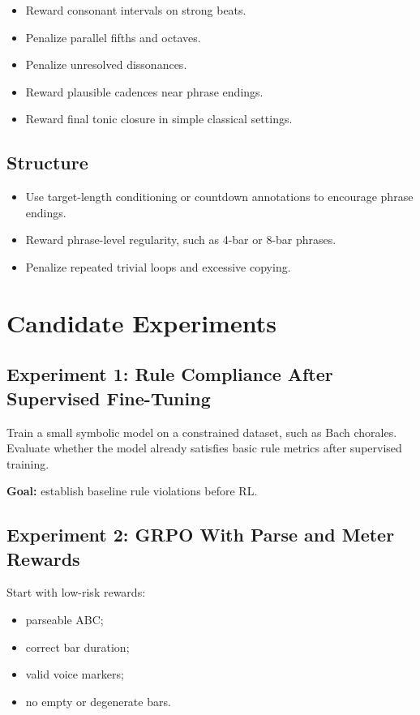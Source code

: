 \documentclass[11pt]{article}
\begin{document}
\begin{itemize}[leftmargin=*]
  \item Reward consonant intervals on strong beats.
  \item Penalize parallel fifths and octaves.
  \item Penalize unresolved dissonances.
  \item Reward plausible cadences near phrase endings.
  \item Reward final tonic closure in simple classical settings.
\end{itemize}

\subsection{Structure}

\begin{itemize}[leftmargin=*]
  \item Use target-length conditioning or countdown annotations to encourage
  phrase endings.
  \item Reward phrase-level regularity, such as 4-bar or 8-bar phrases.
  \item Penalize repeated trivial loops and excessive copying.
\end{itemize}

\section{Candidate Experiments}
\label{sec:experiments}

\subsection{Experiment 1: Rule Compliance After Supervised Fine-Tuning}

Train a small symbolic model on a constrained dataset, such as Bach chorales.
Evaluate whether the model already satisfies basic rule metrics after
supervised training.

\textbf{Goal:} establish baseline rule violations before RL.

\subsection{Experiment 2: GRPO With Parse and Meter Rewards}

Start with low-risk rewards:

\begin{itemize}[leftmargin=*]
  \item parseable ABC;
  \item correct bar duration;
  \item valid voice markers;
  \item no empty or degenerate bars.
\end{itemize}
\end{document}
